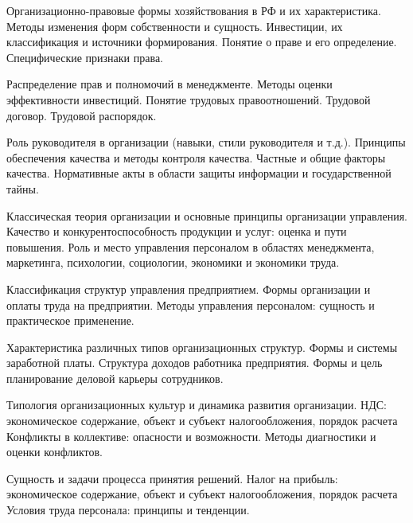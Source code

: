 \documentclass[
	11pt,
	a4paper,
	]
	{article}
\begin{document}
\bigskip

\noindent{} 
	{
		Организационно-правовые формы хозяйствования в РФ и их характеристика. Методы изменения форм собственности и сущность.
	}{
		Инвестиции, их классификация и источники формирования.
	}{
		Понятие о праве и его определение. Специфические признаки права.
	}

\bigskip

\noindent{} 
	{
		Распределение прав и полномочий в менеджменте.
	}{
		Методы оценки эффективности инвестиций.
	}{
		Понятие трудовых правоотношений. Трудовой договор. Трудовой распорядок.
	}

\bigskip

\noindent{} 
	{
		Роль руководителя в организации (навыки, стили руководителя и т.д.).
	}{
		Принципы обеспечения качества и методы контроля качества. Частные и общие факторы качества.
	}{
		Нормативные акты в области защиты информации и государственной тайны.
	}

\bigskip

\noindent{} 
	{
		Классическая теория организации и основные принципы организации управления.
	}{
		Качество и конкурентоспособность продукции и услуг: оценка и пути повышения.
	}{
		Роль и место управления персоналом в областях менеджмента, маркетинга, психологии, социологии, экономики и экономики труда.
	}

\bigskip

\noindent{} 
	{
		Классификация структур управления предприятием.
	}{
		Формы организации и оплаты труда на предприятии.
	}{
		Методы управления персоналом: сущность и практическое применение.
	}

\bigskip

\noindent{} 
	{
		Характеристика различных типов организационных структур.
	}{
		Формы и системы заработной платы. Структура доходов работника предприятия.
	}{
		Формы и цель планирование деловой карьеры сотрудников.
	}

\bigskip

\noindent{} 
	{
		Типология организационных культур и динамика развития организации.
	}{
		НДС: экономическое содержание, объект и субъект налогообложения, порядок расчета
	}{
		Конфликты в коллективе: опасности и возможности. Методы диагностики и оценки конфликтов.
	}

\bigskip

\noindent{} 
	{
		Сущность и задачи процесса принятия решений.
	}{
		Налог на прибыль: экономическое содержание, объект и субъект налогообложения, порядок расчета
	}{
		Условия труда персонала: принципы и тенденции.
	}
\end{document}
